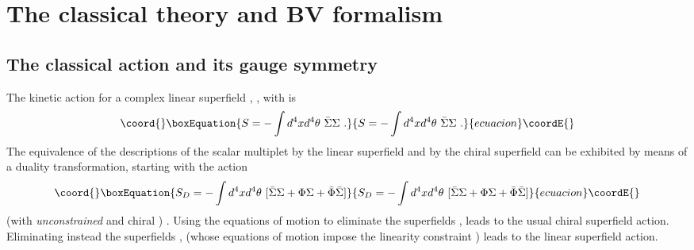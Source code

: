 \documentclass[a4paper,12pt]{article}
\begin{document}
\newpage

\section{The classical theory and  BV formalism}
\label{review}

\subsection{The classical action and its gauge symmetry}
\label{classical}

The kinetic action for a complex linear superfield \myHighlight{$\Sigma$}\coordHE{}, \myHighlight{$\bar\Sigma$}\coordHE{},
with \coordHE{} is 
\begin{equation}\coord{}\boxEquation{
  S=- \int d^4x d^4 \theta ~ \bar\Sigma \Sigma~.
}{
  S=- \int d^4x d^4 \theta ~ \bar\Sigma \Sigma~.
}{ecuacion}\coordE{}\end{equation}
The equivalence of the descriptions of the scalar
multiplet by the linear superfield \myHighlight{$\Sigma$}\coordHE{} and by the chiral superfield
\myHighlight{$\Phi$}\coordHE{} can be exhibited by means of a duality transformation, starting
with the action
\begin{equation}\coord{}\boxEquation{
  S_D = -\int d^4x d^4 \theta ~ [ \bar{\Sigma} \Sigma +\Phi \Sigma
+\bar\Phi \bar{\Sigma} ]
}{
  S_D = -\int d^4x d^4 \theta ~ [ \bar{\Sigma} \Sigma +\Phi \Sigma
+\bar\Phi \bar{\Sigma} ]
}{ecuacion}\coordE{}\end{equation}
(with { \em unconstrained} \myHighlight{$\Sigma$}\coordHE{} and chiral
\myHighlight{$\Phi$}\coordHE{}) \cite{superspace}.  Using the equations of motion to eliminate
the superfields \myHighlight{$\Sigma, \bar\Sigma$}\coordHE{}, leads to the usual chiral superfield
action. Eliminating instead the superfields \myHighlight{$\Phi$}\coordHE{}, \myHighlight{$\bar\Phi$}\coordHE{} (whose
equations of motion impose the linearity constraint \coordHE{}) leads to the linear superfield action.
\end{document}
